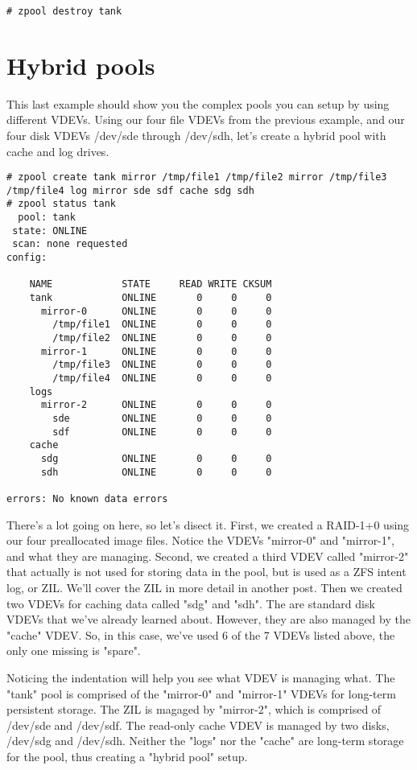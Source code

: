 \documentclass{book}
\begin{document}
\begin{lstlisting}
# zpool destroy tank
\end{lstlisting}

\section{Hybrid pools}
This last example should show you the complex pools you can setup by using
different VDEVs. Using our four file VDEVs from the previous example, and
our four disk VDEVs /dev/sde through /dev/sdh, let's create a hybrid pool
with cache and log drives.

\begin{lstlisting}
# zpool create tank mirror /tmp/file1 /tmp/file2 mirror /tmp/file3 /tmp/file4 log mirror sde sdf cache sdg sdh
# zpool status tank
  pool: tank
 state: ONLINE
 scan: none requested
config:

    NAME            STATE     READ WRITE CKSUM
    tank            ONLINE       0     0     0
      mirror-0      ONLINE       0     0     0
        /tmp/file1  ONLINE       0     0     0
        /tmp/file2  ONLINE       0     0     0
      mirror-1      ONLINE       0     0     0
        /tmp/file3  ONLINE       0     0     0
        /tmp/file4  ONLINE       0     0     0
    logs
      mirror-2      ONLINE       0     0     0
        sde         ONLINE       0     0     0
        sdf         ONLINE       0     0     0
    cache
      sdg           ONLINE       0     0     0
      sdh           ONLINE       0     0     0

errors: No known data errors
\end{lstlisting}

There's a lot going on here, so let's disect it. First, we created a RAID-1+0
using our four preallocated image files. Notice the VDEVs "mirror-0" and
"mirror-1", and what they are managing. Second, we created a third VDEV called
"mirror-2" that actually is not used for storing data in the pool, but is used
as a ZFS intent log, or ZIL. We'll cover the ZIL in more detail in another
post. Then we created two VDEVs for caching data called "sdg" and "sdh". The
are standard disk VDEVs that we've already learned about. However, they are
also managed by the "cache" VDEV. So, in this case, we've used 6 of the 7 VDEVs
listed above, the only one missing is "spare".

Noticing the indentation will help you see what VDEV is managing what. The
"tank" pool is comprised of the "mirror-0" and "mirror-1" VDEVs for long-term
persistent storage. The ZIL is magaged by "mirror-2", which is comprised of
/dev/sde and /dev/sdf. The read-only cache VDEV is managed by two disks,
/dev/sdg and /dev/sdh. Neither the "logs" nor the "cache" are long-term storage
for the pool, thus creating a "hybrid pool" setup.
\end{document}
